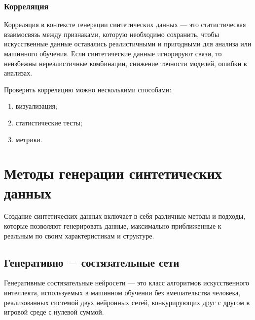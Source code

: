 \subsubsection{Корреляция}

Корреляция в контексте генерации синтетических данных --- это статистическая взаимосвязь между признаками, которую необходимо сохранить, чтобы искусственные данные оставались реалистичными и пригодными для анализа или машинного обучения.
Если синтетические данные игнорируют связи, то неизбежны нереалистичные комбинации, снижение точности моделей, ошибки в анализах.

Проверить корреляцию можно несколькими способами:
\begin{enumerate}[label*=---]
	\item визуализация;
	\item статистические тесты;
	\item метрики.
\end{enumerate}


\section{Методы генерации синтетических данных}

Создание синтетических данных включает в себя различные методы и подходы, которые позволяют генерировать данные, максимально приближенные к реальным по своим характеристикам и структуре.

\subsection{Генеративно~--~состязательные сети}

Генеративные состязательные нейросети --- это класс алгоритмов
искусственного интеллекта, используемых в машинном обучении без
вмешательства человека, реализованных системой двух нейронных сетей,
конкурирующих друг с другом в игровой среде с нулевой суммой.



